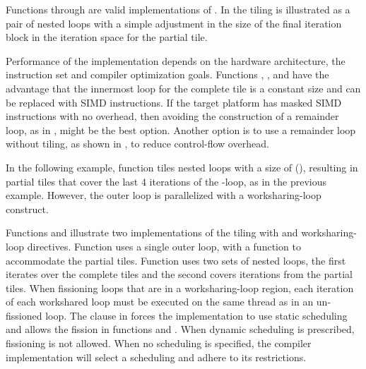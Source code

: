 Functions  through  are valid implementations of .
In  the tiling is illustrated as a pair of nested loops with a simple
adjustment in the size of the final iteration block in the  iteration space
for the partial tile.

Performance of the implementation depends on the hardware architecture, the instruction set and compiler optimization goals.
Functions , , and  have the advantage that
the innermost loop for the complete tile is a constant size and can be replaced with SIMD instructions.
If the target platform has masked SIMD instructions with no overhead, then avoiding the construction of a
remainder loop, as in , might be the best option.
Another option is to use a remainder loop without tiling, as shown in , to reduce control-flow overhead.



In the following example, function  tiles nested loops with a size of (),
resulting in partial tiles that cover the last 4 iterations of the -loop, as
in the previous example. However, the outer loop is parallelized with a
 worksharing-loop construct.

Functions  and  illustrate two implementations of the tiling
with  and worksharing-loop directives.  Function  uses a single outer loop, with a  function
to accommodate the partial tiles. Function 
uses two sets of nested loops, the first iterates over the complete tiles and the
second covers iterations from the partial tiles. When fissioning loops that
are in a  worksharing-loop region, each iteration of each workshared loop
must be executed on the same thread as in an un-fissioned loop. The  clause in 
forces the implementation to use static scheduling and allows the fission in functions  and .
When dynamic scheduling is prescribed, fissioning is not allowed. When no scheduling is specified,
the compiler implementation will select a scheduling  and adhere to its restrictions.

